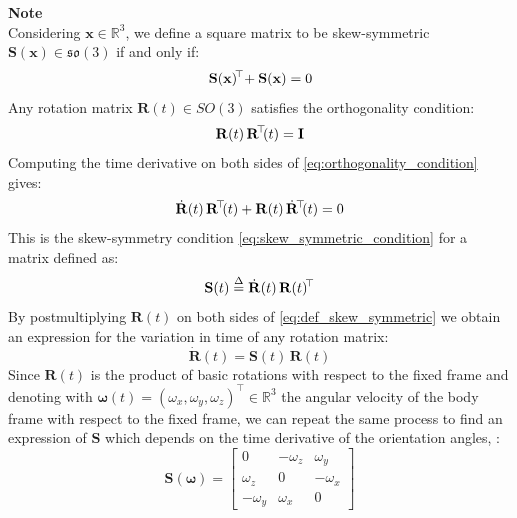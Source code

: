     
\noindent
\textbf{Note}
\\
Considering \( \mathbf{x} \in \mathbb{R}^3 \), we define a square matrix to 
be skew-symmetric \( \mathbf{S}(\mathbf{x}) \in \mathfrak{so}(3) \)
if and only if:
\begin{equation}
\mathbf{S}(\mathbf{x})\mkern-3mu^\top \mkern-4mu + \mathbf{S}(\mathbf{x}) = 0
\label{eq:skew_symmetric_condition}
\end{equation}
\noindent
Any rotation matrix \( \mathbf{R}(t) \in SO(3)\) satisfies the orthogonality condition:
\begin{equation}
\mathbf{R}(t) \, \mathbf{R}\mkern-3mu^\top\mkern-4mu(t) = \mathbf{I}
\label{eq:orthogonality_condition}
\end{equation}
\noindent
Computing the time derivative on both sides of \eqref{eq:orthogonality_condition} gives:
\begin{equation}
\dot{\mathbf{R}}(t) \, \mathbf{R}\mkern-3mu^\top\mkern-4mu(t) + \mathbf{R}(t) \, \dot{\mathbf{R}}\mkern-3mu^\top\mkern-4mu(t) = 0
\label{eq:time_derivative_orthogonality}
\end{equation}
\noindent
This is the skew-symmetry condition \eqref{eq:skew_symmetric_condition} 
for a matrix defined as:
\begin{equation}
\mathbf{S}(t) \stackrel{\Delta}{=} \dot{\mathbf{R}}(t) \, \mathbf{R}(t)\mkern-3mu^\top
\label{eq:def_skew_symmetric}
\end{equation}
\noindent
By postmultiplying $\mathbf{R}(t)$ on both sides of \ref{eq:def_skew_symmetric} we
obtain an expression for the variation in time of any rotation matrix:
\begin{equation}
\dot{\mathbf{R}}(t) = \mathbf{S}(t) \, \mathbf{R}(t)
\label{eq:skew_symmetric_rotation}
\end{equation}
\noindent
Since $\mathbf{R}(t)$ is the product of basic rotations with respect to the fixed frame and  
denoting with $ \boldsymbol{\omega}(t) = (\omega_x, \omega_y,  \omega_z)^\top \in \mathbb{R}^3$ the angular velocity of the body frame with respect to the fixed frame, 
we can repeat the same process to find an expression of $\mathbf{S}$ which depends on the time
derivative of the orientation angles, \cite{book-robotics}:
\begin{equation}
\mathbf{S}(\boldsymbol{\omega}) = 
\begin{bmatrix}
    0 & -\omega_z & \omega_y \\
    \omega_z & 0 & -\omega_x \\
    -\omega_y & \omega_x & 0
\end{bmatrix}
\label{eq:skew_symmetric_matrix}
\end{equation}
